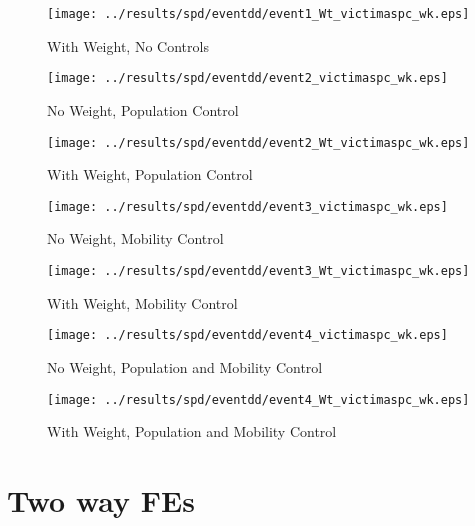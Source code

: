 \documentclass[11pt,letterpaper]{article}
\begin{document}
\begin{figure}[H]
\caption{With Weight, No Controls}
\centering
\texttt{[image: ../results/spd/eventdd/event1\_Wt\_victimaspc\_wk.eps]}
\end{figure}
\begin{figure}[hbtp]
\caption{No Weight, Population Control}
\centering
\texttt{[image: ../results/spd/eventdd/event2\_victimaspc\_wk.eps]}
\end{figure}

\begin{figure}[H]
\caption{With Weight, Population Control}
\centering
\texttt{[image: ../results/spd/eventdd/event2\_Wt\_victimaspc\_wk.eps]}
\end{figure}
\begin{figure}[H]
\caption{No Weight, Mobility Control}
\centering
\texttt{[image: ../results/spd/eventdd/event3\_victimaspc\_wk.eps]}
\end{figure}

\begin{figure}[H]
\caption{With Weight, Mobility Control}
\centering
\texttt{[image: ../results/spd/eventdd/event3\_Wt\_victimaspc\_wk.eps]}
\end{figure}
\begin{figure}[H]
\caption{No Weight, Population and Mobility Control}
\centering
\texttt{[image: ../results/spd/eventdd/event4\_victimaspc\_wk.eps]}
\end{figure}

\begin{figure}[H]
\caption{With Weight, Population and Mobility Control}
\centering
\texttt{[image: ../results/spd/eventdd/event4\_Wt\_victimaspc\_wk.eps]}
\end{figure}

\section{Two way FEs}
\end{document}
